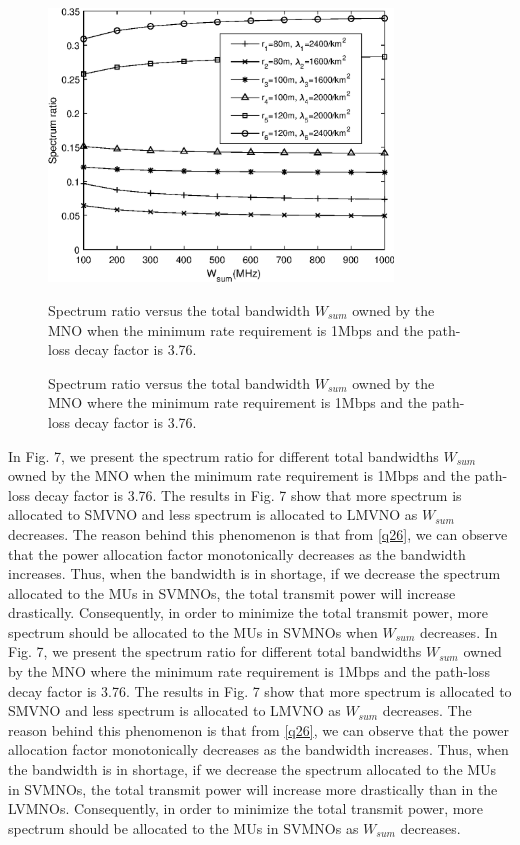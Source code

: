 \documentclass[journal]{IEEEtran}
\begin{document}
\begin{IEEEkeywords}
\begin{figure}
	\centering
	\includegraphics[width=3.6in]{SR_wsum.eps}
	\caption{Spectrum ratio versus the total bandwidth $W_{sum}$ owned by the MNO when the minimum rate requirement is 1Mbps and the path-loss decay factor is 3.76.}
	\caption{Spectrum ratio versus the total bandwidth $W_{sum}$ owned by the MNO where the minimum rate requirement is 1Mbps and the path-loss decay factor is 3.76.}
\end{figure}

In Fig. 7, we present the spectrum ratio for different total bandwidths $W_{sum}$ owned by the MNO when the minimum rate requirement is 1Mbps and the path-loss decay factor is 3.76. The results in Fig. 7 show that more spectrum is allocated to SMVNO and less spectrum is allocated to LMVNO as $W_{sum}$ decreases. The reason behind this phenomenon is that from \eqref{q26}, we can observe that the power allocation factor monotonically decreases as the bandwidth increases. Thus, when the bandwidth is in shortage, if we decrease the spectrum allocated to the MUs in SVMNOs, the total transmit power will increase drastically. Consequently, in order to minimize the total transmit power, more spectrum should be allocated to the MUs in SVMNOs when $W_{sum}$ decreases.
In Fig. 7, we present the spectrum ratio for different total bandwidths $W_{sum}$ owned by the MNO where the minimum rate requirement is 1Mbps and the path-loss decay factor is 3.76. The results in Fig. 7 show that more spectrum is allocated to SMVNO and less spectrum is allocated to LMVNO as $W_{sum}$ decreases. The reason behind this phenomenon is that from \eqref{q26}, we can observe that the power allocation factor monotonically decreases as the bandwidth increases. Thus, when the bandwidth is in shortage, if we decrease the spectrum allocated to the MUs in SVMNOs, the total transmit power will increase more drastically than in the LVMNOs. Consequently, in order to minimize the total transmit power, more spectrum should be allocated to the MUs in SVMNOs as $W_{sum}$ decreases.


\end{IEEEkeywords}
\end{document}
